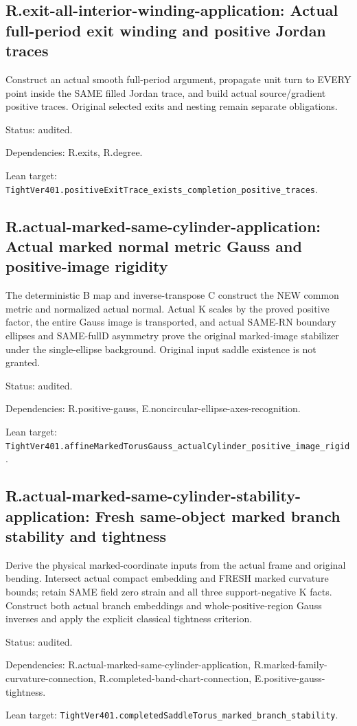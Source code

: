 \documentclass{article}
\begin{document}
\subsection*{R.exit-all-interior-winding-application: Actual full-period exit winding and positive Jordan traces}
Construct an actual smooth full-period argument, propagate unit turn to EVERY point inside the SAME filled Jordan trace, and build actual source/gradient positive traces. Original selected exits and nesting remain separate obligations.
\par Status: audited.
\par Dependencies: R.exits, R.degree.
\par Lean target: \texttt{TightVer401.positiveExitTrace\_exists\_completion\_positive\_traces}.
\subsection*{R.actual-marked-same-cylinder-application: Actual marked normal metric Gauss and positive-image rigidity}
The deterministic B map and inverse-transpose C construct the NEW common metric and normalized actual normal. Actual K scales by the proved positive factor, the entire Gauss image is transported, and actual SAME-RN boundary ellipses and SAME-fullD asymmetry prove the original marked-image stabilizer under the single-ellipse background. Original input saddle existence is not granted.
\par Status: audited.
\par Dependencies: R.positive-gauss, E.noncircular-ellipse-axes-recognition.
\par Lean target: \texttt{TightVer401.affineMarkedTorusGauss\_actualCylinder\_positive\_image\_rigid}.
\subsection*{R.actual-marked-same-cylinder-stability-application: Fresh same-object marked branch stability and tightness}
Derive the physical marked-coordinate inputs from the actual frame and original bending. Intersect actual compact embedding and FRESH marked curvature bounds; retain SAME field zero strain and all three support-negative K facts. Construct both actual branch embeddings and whole-positive-region Gauss inverses and apply the explicit classical tightness criterion.
\par Status: audited.
\par Dependencies: R.actual-marked-same-cylinder-application, R.marked-family-curvature-connection, R.completed-band-chart-connection, E.positive-gauss-tightness.
\par Lean target: \texttt{TightVer401.completedSaddleTorus\_marked\_branch\_stability}.
\end{document}
